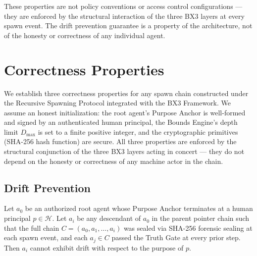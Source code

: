 These properties are not policy conventions or access control configurations — they are enforced by the structural interaction of the three BX3 layers at every spawn event. The drift prevention guarantee is a property of the architecture, not of the honesty or correctness of any individual agent.


\section{Correctness Properties}\label{sec:correctness-properties}

We establish three correctness properties for any spawn chain constructed under the Recursive Spawning Protocol integrated with the BX3 Framework. We assume an honest initialization: the root agent's Purpose Anchor is well-formed and signed by an authenticated human principal, the Bounds Engine's depth limit $D_{\max}$ is set to a finite positive integer, and the cryptographic primitives (SHA-256 hash function) are secure. All three properties are enforced by the structural conjunction of the three BX3 layers acting in concert — they do not depend on the honesty or correctness of any machine actor in the chain.

\subsection{Drift Prevention}

\begin{theorem}\label{th:drift-prevention}
Let $a_0$ be an authorized root agent whose Purpose Anchor terminates at a human principal $p \in \mathcal{H}$. Let $a_i$ be any descendant of $a_0$ in the parent pointer chain such that the full chain $C = (a_0, a_1, \ldots, a_i)$ was sealed via SHA-256 forensic sealing at each spawn event, and each $a_j \in C$ passed the Truth Gate at every prior step. Then $a_i$ cannot exhibit drift with respect to the purpose of $p$.
\end{theorem}

